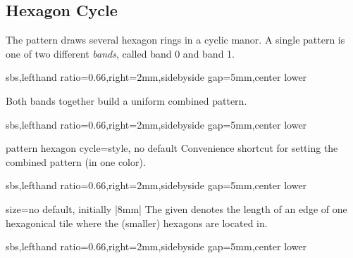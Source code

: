 \documentclass[a4paper,11pt]{article}
\begin{document}
\clearpage
\subsection{Hexagon Cycle}
The  pattern draws several hexagon rings in a cyclic manor.
A single pattern is one of two different \emph{bands}, called band 0 and band 1.

\begin{dispExample*}{sbs,lefthand ratio=0.66,right=2mm,sidebyside gap=5mm,center lower}
\end{dispExample*}

Both bands together build a uniform combined pattern.

\begin{dispExample*}{sbs,lefthand ratio=0.66,right=2mm,sidebyside gap=5mm,center lower}
\end{dispExample*}

\begin{docTikzKey}{pattern hexagon cycle}{=}{style, no default}
  Convenience shortcut for setting the combined pattern (in one color).

\begin{dispExample*}{sbs,lefthand ratio=0.66,right=2mm,sidebyside gap=5mm,center lower}
\end{dispExample*}
\end{docTikzKey}

\clearpage

\begin{docPatternKey}{size}{=}{no default, initially |8mm|}
  The given  denotes the length of an edge of one hexagonical tile
  where the (smaller) hexagons are located in.
\begin{dispExample*}{sbs,lefthand ratio=0.66,right=2mm,sidebyside gap=5mm,center lower}
\end{dispExample*}
\end{docPatternKey}
\end{document}
